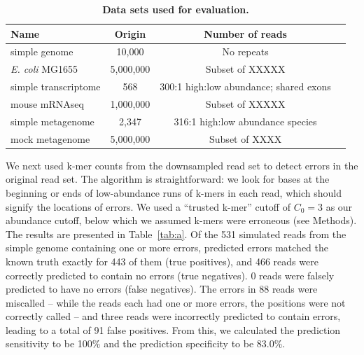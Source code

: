 \documentclass{article}
\begin{document}


\begin{table}
\begin{tabular}{|l|c|c|l|}
\hline
Name & Origin & Number of reads \\
\hline
simple genome & 10,000 & No repeats \\
{\em E. coli} MG1655 & 5,000,000 & Subset of XXXXX \\
simple transcriptome & 568 & 300:1 high:low abundance; shared exons\\
mouse mRNAseq & 1,000,000 & Subset of XXXXX \\
simple metagenome & 2,347 & 316:1 high:low abundance species  \\
mock metagenome & 5,000,000 & Subset of XXXX \\
\hline
\end{tabular}

\caption{{\bf Data sets used for evaluation.}}
\label{tab:data}
\end{table}

We next used k-mer counts from the downsampled read set to detect
errors in the original read set.  The algorithm is straightforward: we
look for bases at the beginning or ends of low-abundance runs of
k-mers in each read, which should signify the locations of errors. We
used a ``trusted k-mer'' cutoff of $C_0 = 3$ as our abundance cutoff,
below which we assumed k-mers were erroneous (see Methods).  The
results are presented in Table~\ref{tab:a}.  Of the 531 simulated
reads from the simple genome containing one or more errors, predicted
errors matched the known truth exactly for 443 of them (true
positives), and 466 reads were correctly predicted to contain no
errors (true negatives). 0 reads were falsely predicted to have no
errors (false negatives). The errors in 88 reads were miscalled --
while the reads each had one or more errors, the positions were not
correctly called -- and three reads were incorrectly predicted to
contain errors, leading to a total of 91 false positives.  From this,
we calculated the prediction sensitivity to be 100\% and the
prediction specificity to be 83.0\%.

\end{document}

